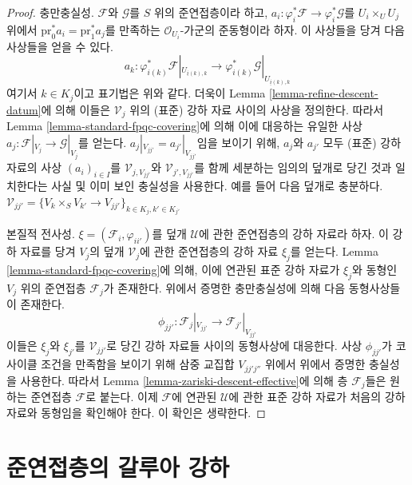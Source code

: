 \begin{proof}
\medskip\noindent
충만충실성. $\mathcal{F}$와 $\mathcal{G}$를 $S$ 위의 준연접층이라 하고,
$a_i : \varphi_i^*\mathcal{F} \to \varphi_i^*\mathcal{G}$를
$U_i \times_U U_j$ 위에서
$\text{pr}_0^*a_i = \text{pr}_1^*a_j$를 만족하는
$\mathcal{O}_{U_i}$-가군의 준동형이라 하자. 이 사상들을 당겨 다음 사상들을
얻을 수 있다.
$$
a_k :
\varphi_{i(k)}^*\mathcal{F}|_{U_{\underline{i}(k), k}}
\longrightarrow
\varphi_{i(k)}^*\mathcal{G}|_{U_{\underline{i}(k), k}}
$$
여기서 $k \in K_j$이고 표기법은 위와 같다. 더욱이 Lemma
\ref{lemma-refine-descent-datum}에 의해 이들은 $\mathcal{V}_j$ 위의
(표준) 강하 자료 사이의 사상을 정의한다. 따라서 Lemma
\ref{lemma-standard-fpqc-covering}에 의해 이에 대응하는 유일한 사상
$a_j : \mathcal{F}|_{V_j} \to \mathcal{G}|_{V_j}$를 얻는다.
$a_j|_{V_{jj'}} = a_{j'}|_{V_{jj'}}$임을 보이기 위해, $a_j$와 $a_{j'}$
모두 (표준) 강하 자료의 사상 $(a_i)_{i \in I}$를
$\mathcal{V}_{j, V_{jj'}}$와 $\mathcal{V}_{j', V_{jj'}}$를 함께 세분하는
임의의 덮개로 당긴 것과 일치한다는 사실 및 이미 보인 충실성을 사용한다.
예를 들어 다음 덮개로 충분하다.
$\mathcal{V}_{jj'} =
\{V_k \times_S V_{k'} \to V_{jj'}\}_{k \in K_j, k' \in K_{j'}}$


\medskip\noindent
본질적 전사성. $\xi = (\mathcal{F}_i, \varphi_{ii'})$를 덮개
$\mathcal{U}$에 관한 준연접층의 강하 자료라 하자. 이 강하 자료를 당겨
$V_j$의 덮개 $\mathcal{V}_j$에 관한 준연접층의 강하 자료 $\xi_j$를 얻는다.
Lemma \ref{lemma-standard-fpqc-covering}에 의해, 이에 연관된 표준 강하
자료가 $\xi_j$와 동형인 $V_j$ 위의 준연접층 $\mathcal{F}_j$가 존재한다.
위에서 증명한 충만충실성에 의해 다음 동형사상들이 존재한다.
$$
\phi_{jj'} :
\mathcal{F}_j|_{V_{jj'}}
\longrightarrow
\mathcal{F}_{j'}|_{V_{jj'}}
$$
이들은 $\xi_j$와 $\xi_{j'}$를 $\mathcal{V}_{jj'}$로 당긴 강하 자료들
사이의 동형사상에 대응한다. 사상 $\phi_{jj'}$가 코사이클 조건을
만족함을 보이기 위해 삼중 교집합 $V_{jj'j''}$ 위에서 위에서 증명한
충실성을 사용한다. 따라서 Lemma \ref{lemma-zariski-descent-effective}에
의해 층 $\mathcal{F}_j$들은 원하는 준연접층 $\mathcal{F}$로 붙는다.
이제 $\mathcal{F}$에 연관된 $\mathcal{U}$에 관한 표준 강하 자료가 처음의
강하 자료와 동형임을 확인해야 한다. 이 확인은 생략한다.
\end{proof}









\section{준연접층의 갈루아 강하}
\label{section-galois-descent}

